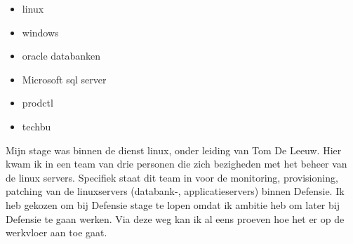 \begin{itemize}
    \item linux
    \item windows
    \item oracle databanken
    \item Microsoft sql server
    \item prodctl
    \item techbu
\end{itemize}

Mijn stage was binnen de dienst linux, onder leiding van Tom De Leeuw. Hier kwam ik in een team van drie personen die zich bezigheden met het beheer van de linux servers. Specifiek staat dit team in voor de monitoring, provisioning, patching van de linuxservers (databank-, applicatieservers) binnen Defensie.
Ik heb gekozen om bij Defensie stage te lopen omdat ik ambitie heb om later bij Defensie te gaan werken. Via deze weg kan ik al eens proeven hoe het er op de werkvloer aan toe gaat.